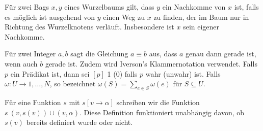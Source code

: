 Für zwei Bags $x,y$ eines Wurzelbaums gilt, dass $y$ ein Nachkomme von $x$ ist, falls es möglich ist ausgehend von $y$ einen Weg zu $x$ zu finden, der im Baum nur in Richtung des Wurzelknotens verläuft. Insbesondere ist $x$ sein eigener Nachkomme.

Für zwei Integer $a,b$ sagt die Gleichung $a \equiv b$ aus, dass $a$ genau dann gerade ist, wenn auch $b$ gerade ist.
Zudem wird Iverson's Klammernotation verwendet. Falls $p$ ein Prädikat ist, dann sei $[p]$ 1 (0) falls $p$ wahr (unwahr) ist.
Falls $\omega:U\rightarrow {1,\dots,N}$, so bezeichnet $\omega(S)=\sum_{e\in S} \omega(e)$ für $S \subseteq U$.

Für eine Funktion $s$ mit $s[v \rightarrow \alpha]$ schreiben wir die Funktion $s \ {(v,s(v))}\cup{(v,\alpha)}$. Diese Definition funktioniert unabhängig davon, ob $s(v)$ bereits definiert wurde oder nicht.
